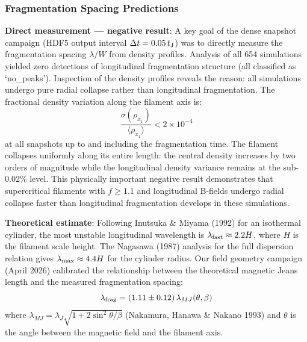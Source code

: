 \documentclass[twocolumn,longtitle,usenatbib]{mnras}
\begin{document}


\subsubsection{Fragmentation Spacing Predictions}

\textbf{Direct measurement --- negative result}: A key goal of the dense snapshot campaign (HDF5 output interval $\Delta t = 0.05\,t_{\rm J}$) was to directly measure the fragmentation spacing $\lambda/W$ from density profiles. Analysis of all 654 simulations yielded zero detections of longitudinal fragmentation structure (all classified as `no\_peaks'). Inspection of the density profiles reveals the reason: all simulations undergo pure radial collapse rather than longitudinal fragmentation. The fractional density variation along the filament axis is:
\begin{equation}
\frac{\sigma(\rho_{x_1})}{\langle \rho_{x_1} \rangle} < 2 \times 10^{-4}
\end{equation}
at all snapshots up to and including the fragmentation time. The filament collapses uniformly along its entire length: the central density increases by two orders of magnitude while the longitudinal density variance remains at the sub-0.02\% level. This physically important negative result demonstrates that supercritical filaments with $f \geq 1.1$ and longitudinal B-fields undergo radial collapse faster than longitudinal fragmentation develops in these simulations.

\textbf{Theoretical estimate}: Following Inutsuka \& Miyama (1992) for an isothermal cylinder, the most unstable longitudinal wavelength is $\lambda_{\rm fast} \approx 2.2 H$, where $H$ is the filament scale height. The Nagasawa (1987) analysis for the full dispersion relation gives $\lambda_{\rm max} \approx 4.4 H$ for the cylinder radius. Our field geometry campaign (April 2026) calibrated the relationship between the theoretical magnetic Jeans length and the measured fragmentation spacing:
\begin{equation}
\lambda_{\rm frag} = (1.11 \pm 0.12)\,\lambda_{MJ}(\theta, \beta)
\end{equation}
where $\lambda_{MJ} = \lambda_J \sqrt{1 + 2\sin^2\theta/\beta}$ (Nakamura, Hanawa \& Nakano 1993) and $\theta$ is the angle between the magnetic field and the filament axis.
\end{document}
